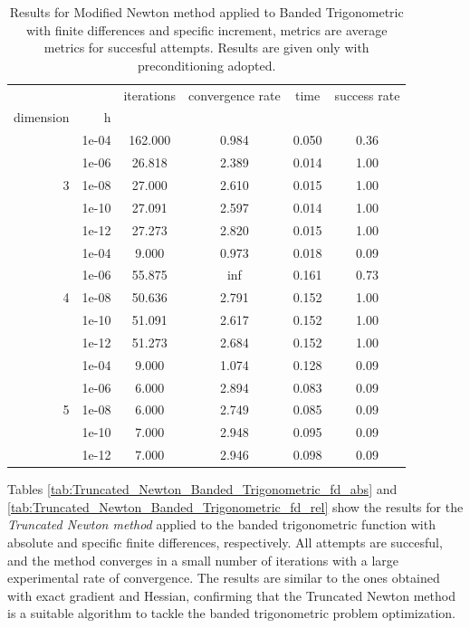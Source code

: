 \begin{table}
\centering
\caption{Results for Modified Newton method applied to Banded Trigonometric with finite differences and specific increment, metrics are average metrics for succesful attempts. Results are given only with preconditioning adopted.}
\label{tab:Modified_Newton_Banded_Trigonometric_fd_rel}
\begin{tabular}{rr|cccc}
\toprule
    &  & iterations & convergence rate & time & success rate \\
dimension & h &  &  &  &  \\
\midrule
\multirow[t]{5}{*}{3} & 1e-04 & 162.000 & 0.984 & 0.050 & 0.36 \\
    & 1e-06 & 26.818 & 2.389 & 0.014 & 1.00 \\
    & 1e-08 & 27.000 & 2.610 & 0.015 & 1.00 \\
    & 1e-10 & 27.091 & 2.597 & 0.014 & 1.00 \\
    & 1e-12 & 27.273 & 2.820 & 0.015 & 1.00 \\
\cline{1-6}
\multirow[t]{5}{*}{4} & 1e-04 & 9.000 & 0.973 & 0.018 & 0.09 \\
    & 1e-06 & 55.875 & inf & 0.161 & 0.73 \\
    & 1e-08 & 50.636 & 2.791 & 0.152 & 1.00 \\
    & 1e-10 & 51.091 & 2.617 & 0.152 & 1.00 \\
    & 1e-12 & 51.273 & 2.684 & 0.152 & 1.00 \\
\cline{1-6}
\multirow[t]{5}{*}{5} & 1e-04 & 9.000 & 1.074 & 0.128 & 0.09 \\
    & 1e-06 & 6.000 & 2.894 & 0.083 & 0.09 \\
    & 1e-08 & 6.000 & 2.749 & 0.085 & 0.09 \\
    & 1e-10 & 7.000 & 2.948 & 0.095 & 0.09 \\
    & 1e-12 & 7.000 & 2.946 & 0.098 & 0.09 \\
\cline{1-6}
\bottomrule
\end{tabular}
\end{table}

Tables \ref{tab:Truncated_Newton_Banded_Trigonometric_fd_abs} and \ref{tab:Truncated_Newton_Banded_Trigonometric_fd_rel} show the results for the \textit{Truncated Newton method} applied to the banded trigonometric function with absolute and specific finite differences, respectively.
All attempts are succesful, and the method converges in a small number of iterations with a large experimental rate of convergence.
The results are similar to the ones obtained with exact gradient and Hessian, confirming that the Truncated Newton method is a suitable algorithm to tackle the banded trigonometric problem optimization.

